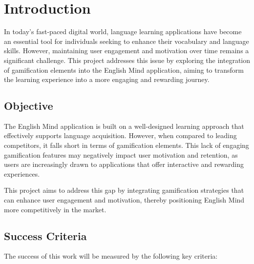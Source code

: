 \chapter{Introduction}

In today's fast-paced digital world, language learning applications have become an essential tool for individuals seeking to enhance their vocabulary and language skills. However, maintaining user engagement and motivation over time remains a significant challenge. This project addresses this issue by exploring the integration of gamification elements into the English Mind application, aiming to transform the learning experience into a more engaging and rewarding journey.

\section*{Objective}

The English Mind application is built on a well-designed learning approach that effectively supports language acquisition. However, when compared to leading competitors, it falls short in terms of gamification elements. This lack of engaging gamification features may negatively impact user motivation and retention, as users are increasingly drawn to applications that offer interactive and rewarding experiences. 

This project aims to address this gap by integrating gamification strategies that can enhance user engagement and motivation, thereby positioning English Mind more competitively in the market.

\newpage

\section*{Success Criteria}

The success of this work will be measured by the following key criteria:

